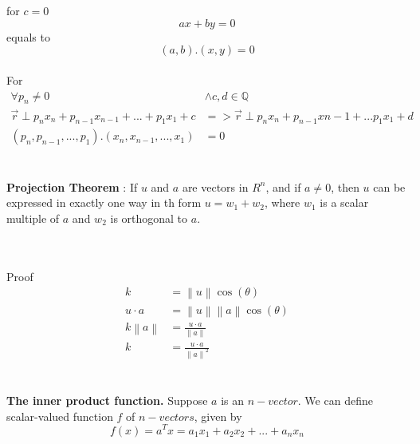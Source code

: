 \documentclass[a4paper, 12pt]{article}
\newcommand{\norm}[1]{\left\lVert#1\right\rVert}
\begin{document}
\\
\\
for $c = 0$ 
\[
ax + by = 0
\]
equals to
\[
(a, b) . (x, y) = 0
\]
\\
For 
\\
\begin{align*}
\forall p_n \ne 0 & \land
c,d \in \mathbb{Q}\\
\vec{r} \perp p_nx_n + p_{n - 1}x_{n - 1} + ... + p_1x_1 + c  &=> \vec{r} \perp p_nx_n + p_{n - 1}x{n - 1} + ... p_1x_1 + d\\
(p_n, p_{n-1}, ..., p_1) . (x_n, x_{n-1}, ..., x_1) &= 0
\end{align*} 
\\
\\
\textbf{Projection Theorem} : If $u$ and $a$ are vectors in $R^n$, and if $a \ne 0$, then $u$ can be expressed in exactly
one way in th form $u = w_1 + w_2$, where $w_1$ is a scalar  multiple of $a$ and $w_2$ is orthogonal to $a$.
\\
\\
\\
Proof
\begin{align*}
k &= \norm{u}\cos(\theta)\\
u \cdot a &= \norm{u}\norm{a}\cos(\theta)\\
k\norm{a} &= \frac{u \cdot a}{\norm{a}} \\
k &= \frac{u \cdot a}{\norm{a}^2}
\end{align*} 
\\
\\
\textbf{The inner product function.} Suppose $a$ is an $n-vector$. We can define scalar-valued
function $f$ of $n-vectors$, given by
\begin{equation}
f(x) = a^Tx = a_1x_1 + a_2x_2+...+a_nx_n
\end{equation}
\end{document}
